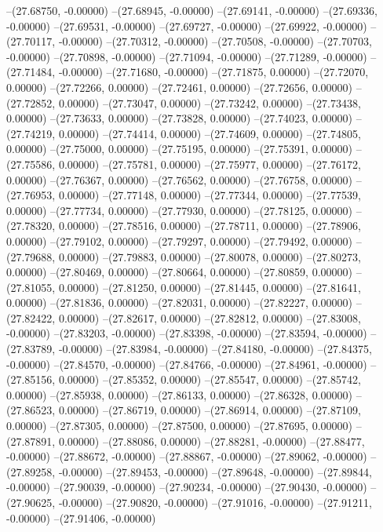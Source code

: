 --(27.68750, -0.00000)
--(27.68945, -0.00000)
--(27.69141, -0.00000)
--(27.69336, -0.00000)
--(27.69531, -0.00000)
--(27.69727, -0.00000)
--(27.69922, -0.00000)
--(27.70117, -0.00000)
--(27.70312, -0.00000)
--(27.70508, -0.00000)
--(27.70703, -0.00000)
--(27.70898, -0.00000)
--(27.71094, -0.00000)
--(27.71289, -0.00000)
--(27.71484, -0.00000)
--(27.71680, -0.00000)
--(27.71875, 0.00000)
--(27.72070, 0.00000)
--(27.72266, 0.00000)
--(27.72461, 0.00000)
--(27.72656, 0.00000)
--(27.72852, 0.00000)
--(27.73047, 0.00000)
--(27.73242, 0.00000)
--(27.73438, 0.00000)
--(27.73633, 0.00000)
--(27.73828, 0.00000)
--(27.74023, 0.00000)
--(27.74219, 0.00000)
--(27.74414, 0.00000)
--(27.74609, 0.00000)
--(27.74805, 0.00000)
--(27.75000, 0.00000)
--(27.75195, 0.00000)
--(27.75391, 0.00000)
--(27.75586, 0.00000)
--(27.75781, 0.00000)
--(27.75977, 0.00000)
--(27.76172, 0.00000)
--(27.76367, 0.00000)
--(27.76562, 0.00000)
--(27.76758, 0.00000)
--(27.76953, 0.00000)
--(27.77148, 0.00000)
--(27.77344, 0.00000)
--(27.77539, 0.00000)
--(27.77734, 0.00000)
--(27.77930, 0.00000)
--(27.78125, 0.00000)
--(27.78320, 0.00000)
--(27.78516, 0.00000)
--(27.78711, 0.00000)
--(27.78906, 0.00000)
--(27.79102, 0.00000)
--(27.79297, 0.00000)
--(27.79492, 0.00000)
--(27.79688, 0.00000)
--(27.79883, 0.00000)
--(27.80078, 0.00000)
--(27.80273, 0.00000)
--(27.80469, 0.00000)
--(27.80664, 0.00000)
--(27.80859, 0.00000)
--(27.81055, 0.00000)
--(27.81250, 0.00000)
--(27.81445, 0.00000)
--(27.81641, 0.00000)
--(27.81836, 0.00000)
--(27.82031, 0.00000)
--(27.82227, 0.00000)
--(27.82422, 0.00000)
--(27.82617, 0.00000)
--(27.82812, 0.00000)
--(27.83008, -0.00000)
--(27.83203, -0.00000)
--(27.83398, -0.00000)
--(27.83594, -0.00000)
--(27.83789, -0.00000)
--(27.83984, -0.00000)
--(27.84180, -0.00000)
--(27.84375, -0.00000)
--(27.84570, -0.00000)
--(27.84766, -0.00000)
--(27.84961, -0.00000)
--(27.85156, 0.00000)
--(27.85352, 0.00000)
--(27.85547, 0.00000)
--(27.85742, 0.00000)
--(27.85938, 0.00000)
--(27.86133, 0.00000)
--(27.86328, 0.00000)
--(27.86523, 0.00000)
--(27.86719, 0.00000)
--(27.86914, 0.00000)
--(27.87109, 0.00000)
--(27.87305, 0.00000)
--(27.87500, 0.00000)
--(27.87695, 0.00000)
--(27.87891, 0.00000)
--(27.88086, 0.00000)
--(27.88281, -0.00000)
--(27.88477, -0.00000)
--(27.88672, -0.00000)
--(27.88867, -0.00000)
--(27.89062, -0.00000)
--(27.89258, -0.00000)
--(27.89453, -0.00000)
--(27.89648, -0.00000)
--(27.89844, -0.00000)
--(27.90039, -0.00000)
--(27.90234, -0.00000)
--(27.90430, -0.00000)
--(27.90625, -0.00000)
--(27.90820, -0.00000)
--(27.91016, -0.00000)
--(27.91211, -0.00000)
--(27.91406, -0.00000)
